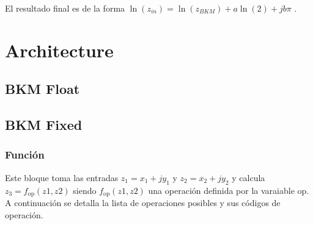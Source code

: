 \documentclass[10pt,a4paper]{book}
\begin{document}
   El resultado final es de la forma $\ln(z_{in}) = \ln(z_{BKM}) + a \ln(2) + j b \pi$ .


\chapter{Architecture}

   \section{BKM Float}

   \section{BKM Fixed}

      \subsection{Funci\'on}
      Este bloque toma las entradas $z_1 = x_1+j y_1$ y $z_2 = x_2+j y_2$ y calcula $z_3 = f_{\text{op}}(z1,z2)$ siendo $f_{\text{op}}(z1,z2)$ una operaci\'on definida por la varaiable op.
      A continuaci\'on se detalla la lista de operaciones posibles y sus c\'odigos de operaci\'on.
\end{document}
